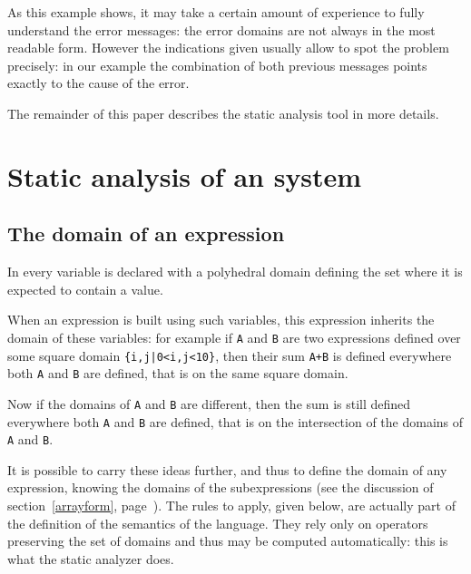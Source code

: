 As this example shows, it may take a certain amount of experience
to fully understand the error messages: the error domains
are not always in the most readable form. However the indications
given usually allow to spot the problem precisely: in our example the
combination of both previous messages points exactly to the cause of
the error.


The remainder of this paper describes the static analysis tool in more
details.



\section{Static analysis of an {\alfa} system}
\label{static-analysis}


\subsection{The domain of an expression\label{expr_check}}

 In {\alfa}
every variable is declared with a polyhedral domain defining the set
where it is expected to contain a value.

When an expression is built using such variables, this expression
inherits the domain of these variables: for example if \texttt{A} and
\texttt{B} are two expressions defined over some square domain
\texttt{\{i,j|0<i,j<10\}}, then their
sum \texttt{A+B} is defined everywhere both \texttt{A} and \texttt{B}
are defined, that is on the same square domain.

Now if the domains of \texttt{A} and \texttt{B} are different, then
the sum is still defined everywhere both \texttt{A} and \texttt{B} are
defined, that is on the intersection of the domains of \texttt{A} and
\texttt{B}.

It is possible to carry these ideas further, and thus to define the
domain of any {\alfa} expression, knowing the domains of the
subexpressions (see the discussion of section~\ref{arrayform},
page~\pageref{arrayform}). The rules to apply, given below, are actually part of
the definition of the semantics of the
language. They rely only on operators preserving the set of {\alfa}
domains and thus may be computed automatically: this is what the
static analyzer does.


